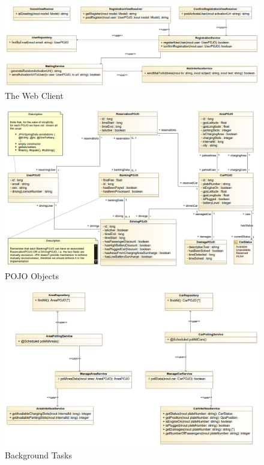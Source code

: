 \documentclass[12pt]{article}
\begin{document}
\begin{figure}[h]
	\centering
	\includegraphics[width=\textwidth]{../Images/WebClient_Class}
	\caption{The Web Client}
\end{figure}

\begin{figure}[h]
	\centering
	\includegraphics[width=\textwidth]{../Images/POJOs}
	\caption{POJO Objects}
\end{figure}

\begin{figure}[h]
	\centering
	\includegraphics[width=\textwidth]{../Images/BackgroundTasks}
	\caption{Background Tasks}
\end{figure}
\clearpage
\end{document}
